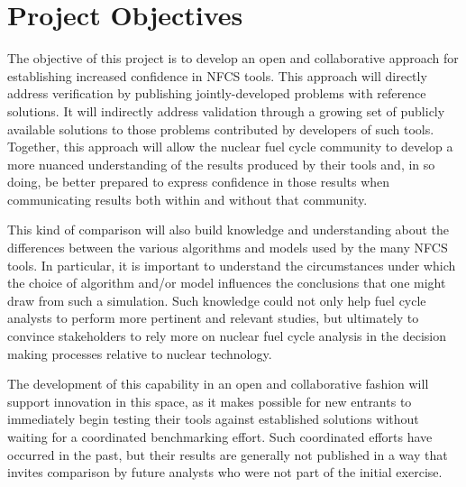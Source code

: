 \section{Project Objectives}

The objective of this project is to develop an open and collaborative approach
for establishing increased confidence in \gls{NFCS} tools. This approach will
directly address verification by publishing jointly-developed problems with
reference solutions.  It will indirectly address validation through a growing
set of publicly available solutions to those problems contributed by
developers of such tools.  Together, this approach will allow the nuclear
fuel cycle community to develop a more nuanced understanding of the results
produced by their tools and, in so doing, be better prepared to express
confidence in those results when communicating results both within and without
that community.

This kind of comparison will also build knowledge and understanding about the
differences between the various algorithms and models used by the many
\gls{NFCS} tools. In particular, it is important to understand the
circumstances under which the choice of algorithm and/or model influences the
conclusions that one might draw from such a simulation. Such knowledge could
not only help fuel cycle analysts to perform more pertinent and relevant
studies, but ultimately to convince stakeholders to rely more on nuclear fuel
cycle analysis in the decision making processes relative to nuclear
technology.

The development of this capability in an open and collaborative fashion will
support innovation in this space, as it makes possible for new entrants to
immediately begin testing their tools against established solutions without
waiting for a coordinated benchmarking effort.  Such coordinated efforts have
occurred in the past, but their results are generally not published in a way
that invites comparison by future analysts who were not part of the initial
exercise.


